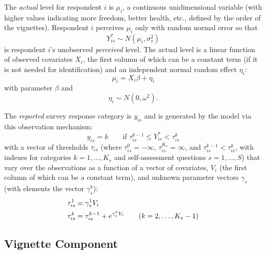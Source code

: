 \documentclass{amsart}
\begin{document}
The \emph{actual} level for respondent $i$ is $\mu_i$, a continuous
unidimensional variable (with higher values indicating more freedom,
better health, etc., defined by the order of the vignettes).
Respondent $i$ perceives $\mu_i$ only with random normal error so that
\begin{equation}
  \label{stoch-s}
  Y_{is}^* \sim N(\mu_i,\sigma^2_s)
\end{equation}
is respondent $i$'s unobserved \emph{perceived} level.  The actual
level is a linear function of observed covariates $X_i$, the first
column of which can be a constant term (if it is not needed for
identification) and an independent normal random effect $\eta_i$:
\begin{equation}
  \label{syst-s}
  \mu_i = X_i\beta + \eta_i
\end{equation}
with parameter $\beta$ and
\begin{equation}
  \label{re}
  \eta_i \sim N(0,\omega^2).
\end{equation}

The \emph{reported} survey response category is $y_{is}$ and is
generated by the model via this observation mechanism:
\begin{equation}
  \label{obsmech-s}
  y_{is} = k \qquad \text{if $\tau_{is}^{k-1}\leq Y_{is}^* < \tau_{is}^k$}
\end{equation}
with a vector of thresholds $\tau_{is}$ (where $\tau_{is}^0=-\infty$,
$\tau_{is}^{K_s}=\infty$, and $\tau^{k-1}_{is}<\tau^k_{is}$, with
indexes for categories $k=1,\dots,K_s$ and self-assessment questions
$s=1,\dots,S$) that vary over the observations as a function of a
vector of covariates, $V_i$ (the first column of which can be a
constant term), and unknown parameter vectors $\gamma_s$ (with
elements the vector $\gamma_s^k$):
\begin{align}
  \label{taus}
  \tau_{is}^1 &= \gamma_s^1 V_i \\ \notag \tau_{is}^k &=
  \tau^{k-1}_{is}+e^{\gamma_s^k V_i}\qquad (k=2,\dots,K_s-1)
\end{align}

\subsection{Vignette Component}
\end{document}
